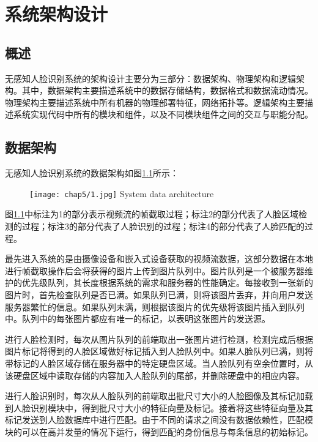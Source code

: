 \chapter{系统架构设计}

\section{概述}

无感知人脸识别系统的架构设计主要分为三部分：数据架构、物理架构和逻辑架构。其中，数据架构主要描述系统中的数据存储结构，数据格式和数据流动情况。物理架构主要描述系统中所有机器的物理部署特征，网络拓扑等。逻辑架构主要描述系统实现代码中所有的模块和组件，以及不同模块组件之间的交互与职能分配。

\section{数据架构}

无感知人脸识别系统的数据架构如图\ref{fig:chap5:data}所示：

\begin{figure}[!htp]
	\centering
	\texttt{[image: chap5/1.jpg]}
	{System data architecture}
	\label{fig:chap5:data}
\end{figure}

图\ref{fig:chap5:data}中标注为1的部分表示视频流的帧截取过程；标注2的部分代表了人脸区域检测的过程；标注3的部分代表了人脸识别的过程；标注4的部分代表了人脸匹配的过程。

最先进入系统的是由摄像设备和嵌入式设备获取的视频流数据，这部分数据在本地进行帧截取操作后会将获得的图片上传到图片队列中。图片队列是一个被服务器维护的优先级队列，其长度根据系统的需求和服务器的性能确定。每接收到一张新的图片时，首先检查队列是否已满。如果队列已满，则将该图片丢弃，并向用户发送服务器繁忙的信息。如果队列未满，则根据该图片的优先级将该图片插入到队列中。队列中的每张图片都应有唯一的标记，以表明这张图片的发送源。

进行人脸检测时，每次从图片队列的前端取出一张图片进行检测，检测完成后根据图片标记将得到的人脸区域做好标记插入到人脸队列中。如果人脸队列已满，则将带标记的人脸区域存储在服务器中的特定硬盘区域。当人脸队列有空余位置时，从该硬盘区域中读取存储的内容加入人脸队列的尾部，并删除硬盘中的相应内容。

进行人脸识别时，每次从人脸队列的前端取出批尺寸大小的人脸图像及其标记加载到人脸识别模块中，得到批尺寸大小的特征向量及标记。接着将这些特征向量及其标记发送到人脸数据库中进行匹配。由于不同的请求之间没有数据依赖性，匹配模块的可以在高并发量的情况下运行，得到匹配的身份信息与每条信息的初始标记。

